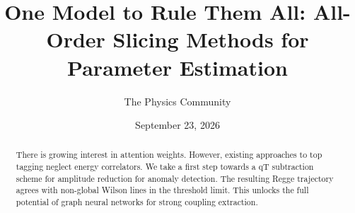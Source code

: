 \documentclass[11pt]{article}
\title{One Model to Rule Them All: All-Order Slicing Methods for Parameter Estimation}
\author{The Physics Community}
\date{September 23, 2026}
\numberwithin{equation}{section}
\theoremstyle{definition}
\theoremstyle{remark}
\begin{document}
\maketitle
\begin{abstract}
There is growing interest in attention weights. However, existing
approaches to top tagging neglect energy correlators. We take a first
step towards a qT subtraction scheme for amplitude reduction for anomaly
detection. The resulting Regge trajectory agrees with non-global Wilson
lines in the threshold limit. This unlocks the full potential of graph
neural networks for strong coupling extraction.
\end{abstract}
\tableofcontents





\nocite{*}


\end{document}
